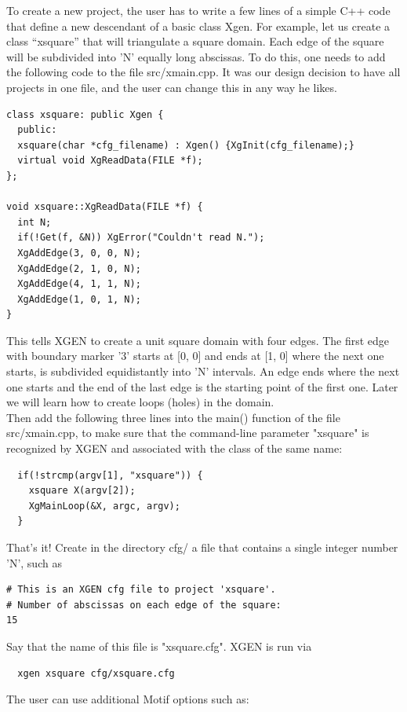 \documentclass[12pt]{article}
\begin{document}
  To create a new project, the user has to write 
  a few lines of a simple C++ code that define a new descendant of
  a basic class Xgen. For example, let us create a class ``xsquare''
  that will triangulate a square domain. Each edge of the square 
  will be subdivided into 'N' equally long abscissas. To do this,
  one needs to add the following code to the file src/xmain.cpp.
  It was our design decision to have all projects in one file, and
  the user can change this in any way he likes.

  \begin{verbatim}
class xsquare: public Xgen {
  public:
  xsquare(char *cfg_filename) : Xgen() {XgInit(cfg_filename);}
  virtual void XgReadData(FILE *f);
};

void xsquare::XgReadData(FILE *f) {
  int N; 
  if(!Get(f, &N)) XgError("Couldn't read N.");
  XgAddEdge(3, 0, 0, N);
  XgAddEdge(2, 1, 0, N);
  XgAddEdge(4, 1, 1, N);
  XgAddEdge(1, 0, 1, N);
}
  \end{verbatim}
This tells XGEN to create a unit square domain with four edges. The first 
  edge with boundary marker '3' starts at [0, 0] and ends at [1, 0] where 
  the next one starts, is subdivided equidistantly into 'N' intervals. An 
  edge ends where the next one starts and the end of the last edge is the 
  starting point of the first one. Later we will learn how to create loops 
  (holes) in the domain.\\
 
  \noindent
  Then add the following three lines into the main() function of the 
  file src/xmain.cpp, to make sure that the command-line parameter
  "xsquare" is recognized by XGEN and associated with the class of
  the same name:
  \begin{verbatim}
  if(!strcmp(argv[1], "xsquare")) {
    xsquare X(argv[2]);
    XgMainLoop(&X, argc, argv);
  }
  \end{verbatim}
  That's it! Create in the directory cfg/ a file that contains a single 
  integer number 'N', such as 
  \begin{verbatim}  
# This is an XGEN cfg file to project 'xsquare'.
# Number of abscissas on each edge of the square:
15
  \end{verbatim}
  Say that the name of this file is "xsquare.cfg". XGEN is run via
  \begin{verbatim}
  xgen xsquare cfg/xsquare.cfg
  \end{verbatim}
  \noindent
  The user can use additional Motif options such as:
\end{document}
